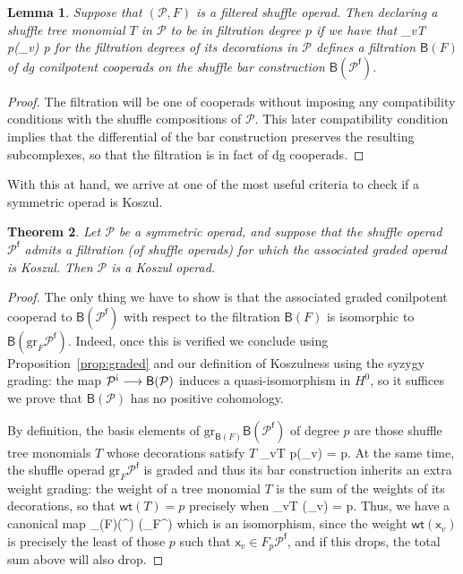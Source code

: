 \documentclass[fleqn, a4paper, twoside]{article}
\makeatletter
\newcommand{\antishriek}{\text{\raisebox{\depth}{\textexclamdown}}}
\newcommand{\0}{\langle 0\rangle}
\newcommand{\B}[1]{\mathsf{B}(#1)}
\newcommand{\f}{\mathsf{f}}
\let\[\@undefined
\DeclareRobustCommand{\[}{\begin{equation}}%
\let\]\@undefined
\DeclareRobustCommand{\]}{\end{equation}}%
\theoremstyle{mytheorem}
\newtheorem{theorem}{Theorem}[section]
\newtheorem{lemma}[theorem]{Lemma}
\theoremstyle{introthm}
\theoremstyle{mydefinition}
\theoremstyle{mydefinition2}
\theoremstyle{plain} %
\newcommand{\?}{\,?\,}
\newcommand{\PP}{{\mathcal{P}}}
\theoremstyle{mytheorem}
\theoremstyle{plain} %
\makeatother
\begin{document}
 \begin{lemma}
 Suppose that $(\PP,F)$ is a filtered shuffle operad.
 Then declaring a shuffle tree monomial $T$ in $\PP$
 to be in filtration degree $p$ if we have that
 \[\sum_{v\in T} p(_v) \leqslant p \]
 for the filtration degrees of its decorations
 in $\PP$ defines a filtration $\B{F}$ 
 of dg conilpotent
 cooperads on the shuffle bar construction
 $\B{\PP^\f}$.
 \end{lemma}
 
 \begin{proof}
 The filtration will be one of cooperads without
 imposing any compatibility conditions with the
 shuffle compositions of $\PP$. This
 later compatibility condition implies that
 the differential of the bar construction
 preserves the resulting subcomplexes,
 so that the filtration is in fact of dg
 cooperads.  \end{proof}
 
 With this at hand, we arrive at one of the most
 useful criteria to check if a symmetric operad
 is Koszul.
 
 \begin{theorem}
 Let $\PP$ be a symmetric operad, and suppose
 that the shuffle operad $\PP^\f$ admits
 a filtration (of shuffle operads) for which
 the associated graded operad is Koszul.
 Then $\PP$ is a Koszul operad.
 \end{theorem}
 
 \begin{proof}
 The only thing we have to show is that the
 associated graded conilpotent cooperad to
 $\B{\PP^\f}$ with respect to the filtration
 $\B{F}$ is isomorphic to $\B{\mathrm{gr}_F\PP^\f}$.
 Indeed, once this is verified we conclude using
 Proposition~\ref{prop:graded} and our definition
 of Koszulness using the syzygy grading: the
 map $\PP^\antishriek \longrightarrow \B{\PP}$
 induces a quasi-isomorphism in $H^0$, so it suffices
 we prove that $\B{\PP}$ has no positive cohomology.
 
 By definition, the basis elements of
 $\mathrm{gr}_{\B{F}}\B{\PP^\f}$ of degree $p$
 are those shuffle tree monomials $T$
 whose decorations satisfy $T$
 \[
 \sum_{v\in T} p(_v) = p.
 \]
 At the same time, the shuffle operad 
 $\mathrm{gr}_F\PP^\f$  is graded and 
 thus its bar construction inherits an
 extra weight grading: the weight of a tree
 monomial $T$ is the sum of the weights of its
 decorations, so that $\mathsf{wt}(T)= p$
 precisely when
 \[
 \sum_{v\in T} (_v) = p.
 \]
 Thus, we have a canonical map
 \[
 _{\B{F}}\B{\PP^\f} \longrightarrow
 \B{_F\PP^\f}
 \]
 which is an isomorphism, since the weight
 $\mathsf{wt}(\mathsf{x}_v)$ is precisely
 the least of those $p$ such that $\mathsf{x}_v
 \in F_p\PP^\f$, and if this drops, the total sum above
 will also drop. 
 \end{proof}
 
\end{document}
